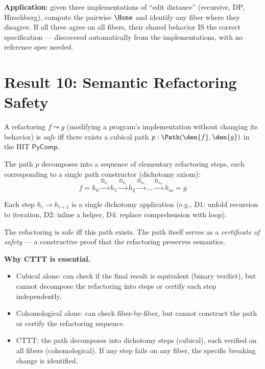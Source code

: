 \textbf{Application}: given three implementations of ``edit distance''
(recursive, DP, Hirschberg), compute the pairwise $\Hone$ and
identify any fiber where they disagree.  If all three agree on all
fibers, their shared behavior IS the correct specification ---
discovered automatically from the implementations, with no reference
spec needed.

\section{Result 10: Semantic Refactoring Safety}

\begin{theorem}
\label{thm:refactor}
A refactoring $f \leadsto g$ (modifying a program's implementation
without changing its behavior) is \emph{safe} iff there exists a
cubical path $p : \Path(\den{f}, \den{g})$ in the HIT
$\mathsf{PyComp}$.

The path $p$ decomposes into a sequence of elementary refactoring
steps, each corresponding to a single path constructor (dichotomy
axiom):
\[
  f = h_0 \xrightarrow{\mathsf{D}_{k_1}} h_1
    \xrightarrow{\mathsf{D}_{k_2}} h_2
    \xrightarrow{\mathsf{D}_{k_3}} \ldots
    \xrightarrow{\mathsf{D}_{k_m}} h_m = g
\]

Each step $h_i \to h_{i+1}$ is a single dichotomy application
(e.g., D1: unfold recursion to iteration, D2: inline a helper,
D4: replace comprehension with loop).

The refactoring is safe iff this path exists.  The path itself
serves as a \emph{certificate of safety} --- a constructive proof
that the refactoring preserves semantics.
\end{theorem}

\textbf{Why CTTT is essential.}
\begin{itemize}
  \item Cubical alone: can check if the final result is equivalent
    (binary verdict), but cannot decompose the refactoring into
    steps or certify each step independently.
  \item Cohomological alone: can check fiber-by-fiber, but cannot
    construct the path or certify the refactoring sequence.
  \item CTTT: the path decomposes into dichotomy steps (cubical),
    each verified on all fibers (cohomological).  If any step
    fails on any fiber, the specific breaking change is identified.
\end{itemize}

